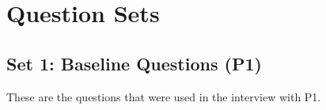 \documentclass[12pt, titlepage]{article}
\begin{document}
\newpage
\appendix
{}


\section{Question Sets}

\subsection*{Set 1: Baseline Questions (P1)}\label{sec:initialQs}

These are the questions that were used in the interview with P1. 
\end{document}
